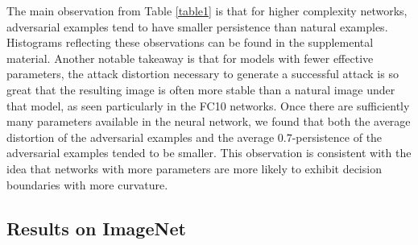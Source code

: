 The main observation from Table \ref{table1} is that for higher complexity networks,
adversarial examples tend to have smaller persistence than natural examples. Histograms reflecting these observations can be found in the supplemental material. %
Another notable takeaway is that for models with fewer effective parameters, the attack distortion necessary to generate a successful attack is so great that the resulting image is often more stable than a natural image under that model, as seen particularly in the FC10 networks. Once there are sufficiently many parameters available in the neural network, we found that both the average distortion of the adversarial examples and the average $0.7$-persistence of the adversarial examples tended to be smaller. This observation is consistent with the idea that networks with more parameters are more likely to exhibit decision boundaries with more curvature.




\subsection{Results on ImageNet}


